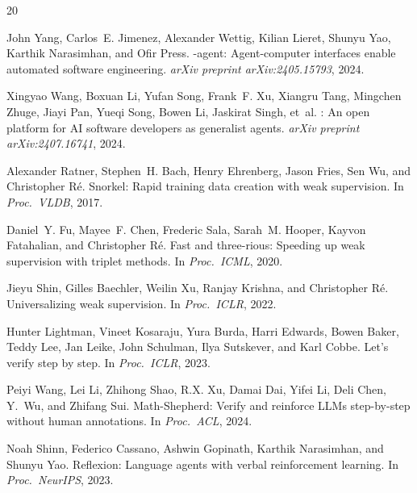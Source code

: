 \documentclass[11pt,a4paper]{article}
\begin{document}

\begin{thebibliography}{20}

John Yang, Carlos~E. Jimenez, Alexander Wettig, Kilian Lieret, Shunyu Yao, Karthik Narasimhan, and Ofir Press.
-agent: Agent-computer interfaces enable automated software engineering.
\newblock \emph{arXiv preprint arXiv:2405.15793}, 2024.

Xingyao Wang, Boxuan Li, Yufan Song, Frank~F. Xu, Xiangru Tang, Mingchen Zhuge, Jiayi Pan, Yueqi Song, Bowen Li, Jaskirat Singh, et~al.
: An open platform for {AI} software developers as generalist agents.
\newblock \emph{arXiv preprint arXiv:2407.16741}, 2024.

Alexander Ratner, Stephen~H. Bach, Henry Ehrenberg, Jason Fries, Sen Wu, and Christopher R{\'e}.
\newblock Snorkel: Rapid training data creation with weak supervision.
\newblock In \emph{Proc.\ VLDB}, 2017.

Daniel~Y. Fu, Mayee~F. Chen, Frederic Sala, Sarah~M. Hooper, Kayvon Fatahalian, and Christopher R{\'e}.
\newblock Fast and three-rious: Speeding up weak supervision with triplet methods.
\newblock In \emph{Proc.\ ICML}, 2020.

Jieyu Shin, Gilles Baechler, Weilin Xu, Ranjay Krishna, and Christopher R{\'e}.
\newblock Universalizing weak supervision.
\newblock In \emph{Proc.\ ICLR}, 2022.

Hunter Lightman, Vineet Kosaraju, Yura Burda, Harri Edwards, Bowen Baker, Teddy Lee, Jan Leike, John Schulman, Ilya Sutskever, and Karl Cobbe.
\newblock Let's verify step by step.
\newblock In \emph{Proc.\ ICLR}, 2023.

Peiyi Wang, Lei Li, Zhihong Shao, R.X. Xu, Damai Dai, Yifei Li, Deli Chen, Y.\ Wu, and Zhifang Sui.
\newblock Math-{S}hepherd: Verify and reinforce {LLM}s step-by-step without human annotations.
\newblock In \emph{Proc.\ ACL}, 2024.

Noah Shinn, Federico Cassano, Ashwin Gopinath, Karthik Narasimhan, and Shunyu Yao.
\newblock Reflexion: Language agents with verbal reinforcement learning.
\newblock In \emph{Proc.\ NeurIPS}, 2023.


\end{thebibliography}
\end{document}
